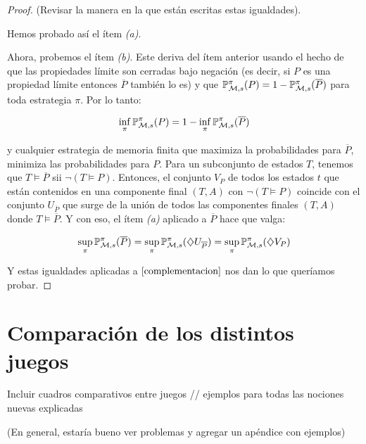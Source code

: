\begin{proof}
	(Revisar la manera en la que están escritas estas igualdades).

	Hemos probado así el ítem \textit{(a)}.

	Ahora, probemos el ítem \textit{(b)}. Este deriva del ítem anterior usando el
	hecho de que las propiedades límite son cerradas bajo negación (es decir, si
	$P$ es una propiedad límite entonces $\overline{P}$ también lo es) y que
	$\mathbb{P}_{\mathcal{M}, s}^\pi (P) = 1 - \mathbb{P}_{\mathcal{M}, s}^\pi(\overline{P})$ para toda estrategia $\pi$. Por
	lo tanto:

	\begin{equation}
		\label{complementacion}
		\inf_{\pi} \mathbb{P}_{\mathcal{M}, s}^\pi (P) = 1 - \inf_{\pi} \mathbb{P}_{\mathcal{M}, s}^\pi(\overline{P})
	\end{equation}

	y cualquier estrategia de memoria finita que maximiza la probabilidades para
	$\overline{P}$, minimiza las probabilidades para $P$. Para un subconjunto de
	estados $T$, tenemos que $T \models \overline{P}$ sii $\neg (T \models P)$.
	Entonces, el conjunto $V_P$ de todos los estados $t$ que están contenidos en
	una componente final $(T,A)$ con $\neg (T \models P)$ coincide con el conjunto
	$U_{\overline{P}}$ que surge de la unión de todos las componentes finales
	$(T,A)$ donde $T \models \overline{P}$. Y con eso, el ítem \textit{(a)}
	aplicado a $\overline{P}$ hace que valga:

	$$
		\sup_\pi \mathbb{P}_{\mathcal{M}, s}^\pi (\overline{P}) = \sup_\pi \mathbb{P}_{\mathcal{M}, s}^\pi (\diamondsuit U_{\overline{P}}) = \sup_\pi \mathbb{P}_{\mathcal{M}, s}^\pi (\diamondsuit V_P)
	$$

	Y estas igualdades aplicadas a $\ref{complementacion}$ nos dan lo que queríamos
	probar.

\end{proof}

\section{Comparación de los distintos juegos}

Incluir cuadros comparativos entre juegos // ejemplos para todas las nociones
nuevas explicadas

(En general, estaría bueno ver problemas y agregar un apéndice con ejemplos)